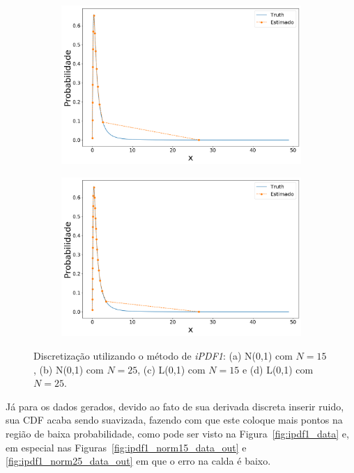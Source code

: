 \begin{figure}[H]
	\begin{subfigure}[b]{0.45\textwidth}
		\centering 
		\includegraphics[width=\linewidth]{./figuras/iPDF1_lognormal_15_1_0_0}
		\caption{}
		\label{fig:ipdflognorm15}
	\end{subfigure}
	\hfill
	\begin{subfigure}[b]{0.45\textwidth}
		\centering 
		\includegraphics[width=\linewidth]{./figuras/iPDF1_lognormal_25_1_0_0}
		\caption{}
		\label{fig:ipdflognorm25}
	\end{subfigure}
	
	\caption{Discretização utilizando o método de \textit{iPDF1}: (a) N(0,1) com $N = 15$, (b) N(0,1) com $N = 25$, (c) L(0,1) com $N = 15$ e (d) L(0,1) com $N = 25$.}
	\label{fig:ipdfmnorm}
\end{figure}

Já para os dados gerados, devido ao fato de sua derivada discreta inserir ruido, sua CDF acaba sendo suavizada, fazendo com que este coloque mais pontos na região de baixa probabilidade, como pode ser visto na Figura~\ref{fig:ipdf1_data} e, em especial nas Figuras~\ref{fig:ipdf1_norm15_data_out} e \ref{fig:ipdf1_norm25_data_out} em que o erro na calda é baixo.

